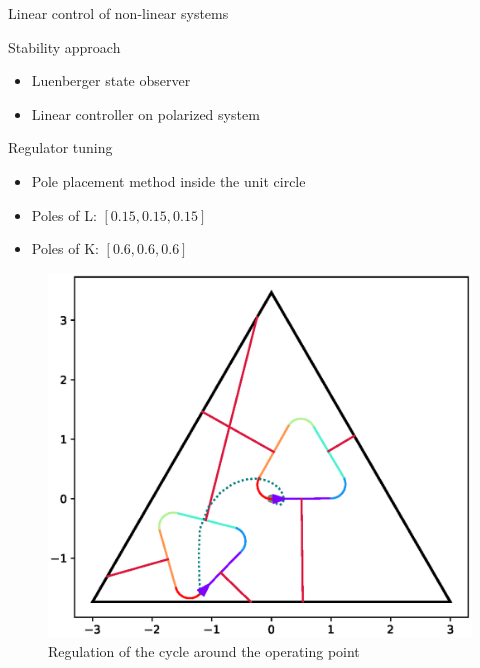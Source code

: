 \documentclass[10pt, xcolor={usenames, dvipsnames}]{beamer}
\begin{document}
        \begin{frame}{Linear control of non-linear systems}
            \begin{minipage}{.5\textwidth}
                \begin{block}{Stability approach}
                    \vspace{2.5mm}
                    \begin{itemize}
                        \item Luenberger state observer
                        \item Linear controller on polarized system
                    \end{itemize}
                \end{block}
                \begin{block}{Regulator tuning}
                    \begin{itemize}
                        \item Pole placement method inside the unit circle
                        \item Poles of L: $[0.15, 0.15, 0.15]$
                        \item Poles of K: $[0.6, 0.6, 0.6]$
                    \end{itemize}
                \end{block}
            \end{minipage}
            \hfill
            \begin{minipage}{.45\textwidth}
                \begin{figure}
                    \includegraphics[width=\textwidth]{imgs/cycle_regulation}
                    \caption{Regulation of the cycle around the operating point}
                \end{figure}
            \end{minipage}
        \end{frame}
\end{document}
